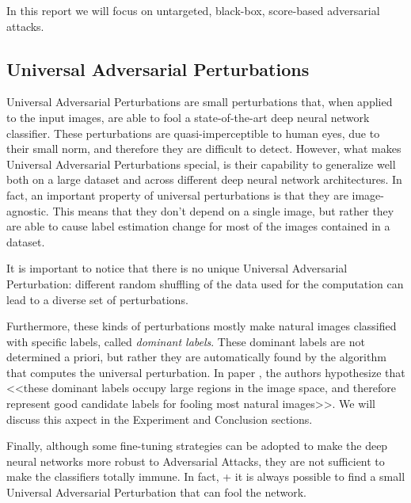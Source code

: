 

In this report we will focus on untargeted, black-box, score-based adversarial attacks.

\subsection{Universal Adversarial Perturbations}
\label{section:perturb}
Universal Adversarial Perturbations are small perturbations that, when applied to the input images, are able
to fool a state-of-the-art deep neural network classifier. These perturbations are quasi-imperceptible to human eyes,
due to their small norm, and therefore they are difficult to detect. However, what makes Universal Adversarial Perturbations special,
is their capability to generalize well both on a large dataset and across different deep neural network architectures.
In fact, an important property of universal perturbations is that they are image-agnostic. This means that
they don't depend on a single image, but rather they are able to cause label estimation change for most of
the images contained in a dataset.

It is important to notice that there is no unique Universal Adversarial Perturbation: different random shuffling of the data used
for the computation can lead to a diverse set of perturbations.

Furthermore, these kinds of perturbations mostly make natural images classified with specific labels, called
\textit{dominant labels}. These dominant labels are not determined a priori, but rather they are automatically
found by the algorithm that computes the universal perturbation. In paper \cite{A2}, the authors
hypothesize that <<these dominant labels occupy large regions in the image space, and therefore represent good
candidate labels for fooling most natural images>>. We will discuss this axpect in the Experiment and Conclusion sections.

Finally, although some fine-tuning strategies can be adopted to make the deep neural networks more robust to Adversarial
Attacks, they are not sufficient to make the classifiers totally immune. In fact, + it is always
possible to find a small Universal Adversarial Perturbation that can fool the network.




